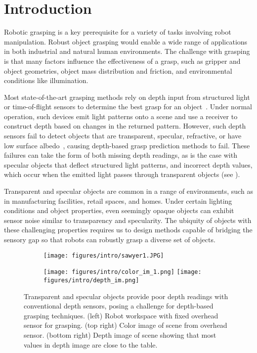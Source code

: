 
\section{Introduction}
\label{sec:intro}

Robotic grasping is a key prerequisite for a variety of tasks involving robot manipulation.
Robust object grasping would enable a wide range of applications in both industrial and natural human environments. 
The challenge with grasping is that many factors influence the effectiveness of a grasp, such as gripper and object geometries, object mass distribution and friction, and environmental conditions like illumination.

Most state-of-the-art grasping methods rely on depth input from structured light or time-of-flight sensors to determine the best grasp for an object~\cite{satish2019policy, morrison2018closing, gualtieri2016high}.
Under normal operation, such devices emit light patterns onto a scene and use a receiver to construct depth based on changes in the returned pattern. 
However, such depth sensors fail to detect objects that are transparent, specular, refractive, or have low surface albedo~\cite{ihrke2010transparent}, causing depth-based grasp prediction methods to fail.
These failures can take the form of both missing depth readings, as is the case with specular objects that deflect structured light patterns, and incorrect depth values, which occur when the emitted light passes through transparent objects (see ). 

Transparent and specular objects are common in a range of environments, such as in manufacturing facilities, retail spaces, and homes. 
Under certain lighting conditions and object properties, even seemingly opaque objects can exhibit sensor noise similar to transparency and specularity.
The ubiquity of objects with these challenging properties requires us to design methods capable of bridging the sensory gap so that robots can robustly grasp a diverse set of objects. 

\begin{figure}[t]
    \centering
    \begin{subfigure}[b]{0.455\columnwidth}
        \centering
        \texttt{[image: figures/intro/sawyer1.JPG]}
    \end{subfigure}%
    \begin{subfigure}[b]{0.54\columnwidth}
        \centering
        \texttt{[image: figures/intro/color\_im\_1.png]}
        \texttt{[image: figures/intro/depth\_im.png]}
    \end{subfigure}
    \caption{Transparent and specular objects provide poor depth readings with conventional depth sensors, posing a challenge for depth-based grasping techniques. (left) Robot workspace with fixed overhead sensor for grasping. (top right) Color image of scene from overhead sensor. (bottom right) Depth image of scene showing that most values in depth image are close to the table.}
    \label{fig:intro}
    \vspace{-1em}
\end{figure}

